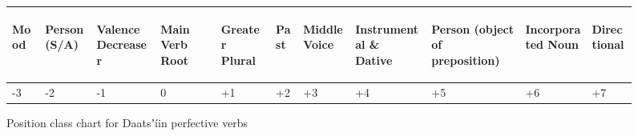 \documentclass[output=paper]{langsci/langscibook}
\begin{document}
\begin{figure}
\begin{tabularx}{\textwidth}{XXXXXXXXXXX}
\begin{turn}{90} Mood \end{turn} & \begin{turn}{90} Person (S/A) \end{turn} & \begin{turn}{90} Valence Decreaser \end{turn} & \begin{turn}{90} Main Verb Root \end{turn} & \begin{turn}{90} Greater Plural \end{turn} & \begin{turn}{90} Past \end{turn} & \begin{turn}{90} Middle Voice \end{turn} & \begin{turn}{90} Instrumental \& Dative \end{turn} & \begin{turn}{90} Person (object of preposition) \end{turn} & \begin{turn}{90} Incorporated Noun \end{turn} & \begin{turn}{90} Directional \end{turn} \\
\midrule
\multicolumn{1}{X}{{}-3} & \multicolumn{1}{X}{{}-2} & \multicolumn{1}{X}{{}-1} & \multicolumn{1}{X}{0} & \multicolumn{1}{X}{+1} & \multicolumn{1}{X}{+2} & \multicolumn{1}{X}{+3} & \multicolumn{1}{X}{+4} & \multicolumn{1}{X}{+5} & \multicolumn{1}{X}{+6} & +7\\
\end{tabularx}
\caption{Position class chart for Daatsʼ\'{i}in perfective verbs}
\label{fig:ahlandc:2}
\end{figure}
\end{document}
